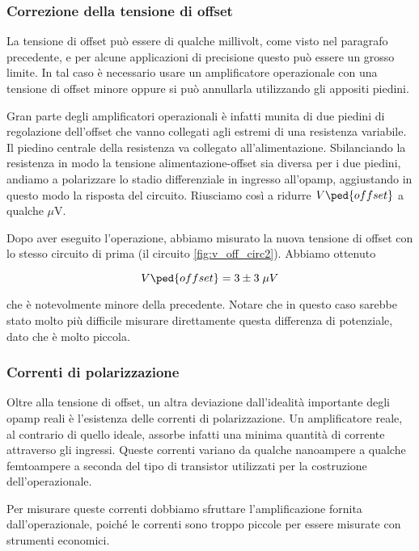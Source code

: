 \subsubsection{Correzione della tensione di offset}

La tensione di offset può essere di qualche millivolt, come visto nel paragrafo precedente,
e per alcune applicazioni di precisione questo può essere un grosso limite.
In tal caso è necessario usare un amplificatore operazionale con una tensione di offset minore
oppure si può annullarla utilizzando gli appositi piedini.

Gran parte degli amplificatori operazionali è infatti munita di due piedini di regolazione dell'offset
che vanno collegati agli estremi di una resistenza variabile. Il piedino centrale della resistenza
va collegato all'alimentazione. Sbilanciando la resistenza in modo la tensione alimentazione-offset
sia diversa per i due piedini, andiamo a polarizzare lo stadio differenziale in ingresso all'opamp,
aggiustando in questo modo la risposta del circuito. Riusciamo così a ridurre $V\ped{offset}$ a qualche
$\mu$\si{\volt}.

Dopo aver eseguito l'operazione, abbiamo misurato la nuova tensione di offset con lo stesso circuito
di prima (il circuito \ref{fig:v_off_circ2}). Abbiamo ottenuto

\begin{equation}
    V\ped{offset} = 3 \pm 3 \; \mu V
\end{equation}

che è notevolmente minore della precedente. Notare che in questo caso sarebbe stato molto più
difficile misurare direttamente questa differenza di potenziale, dato che è molto piccola.

\subsubsection{Correnti di polarizzazione}

Oltre alla tensione di offset, un altra deviazione dall'idealità importante degli opamp reali è l'esistenza
delle correnti di polarizzazione. Un amplificatore reale, al contrario di quello ideale, assorbe infatti una
minima quantità di corrente attraverso gli ingressi. Queste correnti variano da qualche nanoampere a qualche
femtoampere a seconda del tipo di transistor utilizzati per la costruzione dell'operazionale.

Per misurare queste correnti dobbiamo sfruttare l'amplificazione fornita dall'operazionale, poiché
le correnti sono troppo piccole per essere misurate con strumenti economici.

